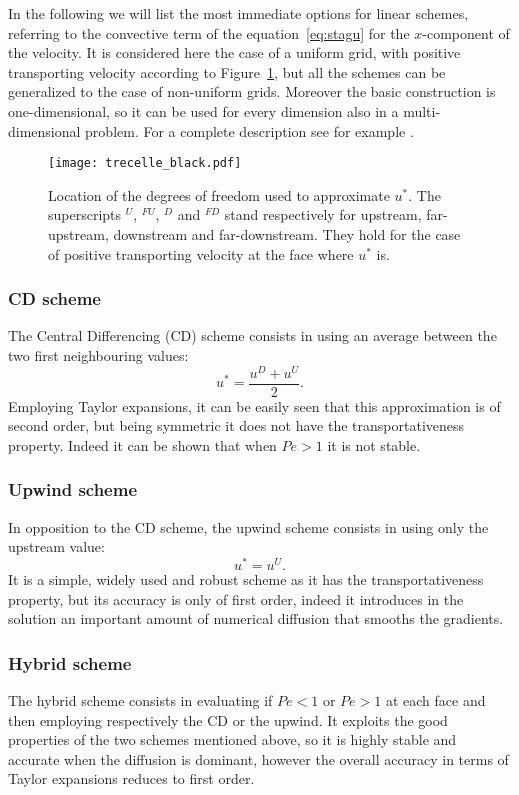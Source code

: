In the following we will list the most immediate options for linear schemes, 
referring to the 
convective term of the equation~\eqref{eq:stagu} for the $x$-component of the 
velocity. It is considered here the case of a uniform grid, with positive 
transporting velocity according to 
Figure~\ref{fig:superscripts}, but all the schemes can be generalized to the 
case of non-uniform grids. Moreover the basic construction is one-dimensional, 
so it can be used for every dimension also in a multi-dimensional problem. For 
a complete description see for example \cite{main:vermal}.
\begin{figure}
	\centering
	\texttt{[image: trecelle\_black.pdf]}
	\caption[Location of the degrees of freedom used to approximate 
	$u^*$]{Location of the degrees of freedom used to approximate $u^*$. The 
	superscripts $^U$, $^{FU}$, $^D$ and $^{FD}$ stand respectively for 
	upstream, far-upstream, downstream and far-downstream. They hold for the 
	case of positive transporting velocity at the face where $u^*$ is.}
	\label{fig:superscripts}
\end{figure}
\subsubsection{CD scheme}
The Central Differencing (CD) scheme consists in using an average between the 
two first neighbouring values:
\begin{equation} \label{eq:cd}
	u^* = \frac{u^D + u^U}{2}.
\end{equation}
Employing Taylor expansions, it can be easily seen that this approximation is 
of second order, but being symmetric it does not have the transportativeness 
property. Indeed it can be shown that when $Pe > 1$ it is not stable.
%
\subsubsection{Upwind scheme}
In opposition to the CD scheme, the upwind scheme consists in using only the 
upstream value:
\begin{equation} \label{eq:upwind}
	u^* = u^U.
\end{equation}
It is a simple, widely used and robust scheme as it has the transportativeness 
property, but its accuracy is only of first order, indeed it introduces in the 
solution an important amount of numerical diffusion that smooths the gradients. 
%
\subsubsection{Hybrid scheme}
The hybrid scheme \cite{diff:hybrid} consists in evaluating if $Pe<1$ or 
$Pe>1$ at each face and then employing respectively the CD or the upwind. It 
exploits the good properties of the two schemes mentioned above, so it is 
highly stable and accurate when the diffusion is dominant, however the overall 
accuracy in terms of Taylor expansions reduces to first order.
%
